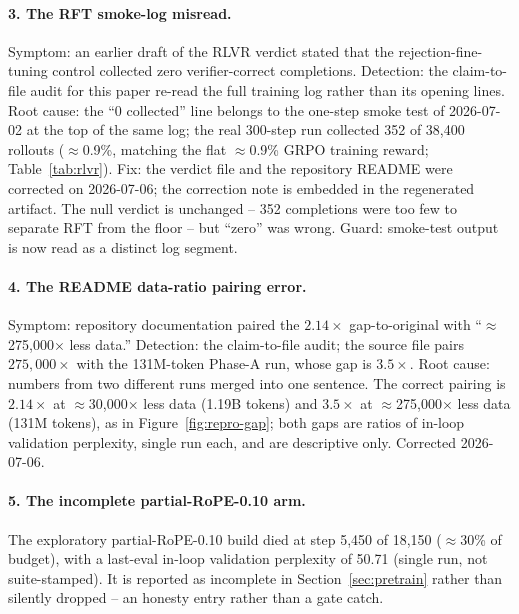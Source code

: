 \paragraph{3. The RFT smoke-log misread.}
Symptom: an earlier draft of the RLVR verdict stated that the rejection-fine-tuning control collected zero verifier-correct completions. Detection: the claim-to-file audit for this paper re-read the full training log rather than its opening lines. Root cause: the ``0 collected'' line belongs to the one-step smoke test of 2026-07-02 at the top of the same log; the real 300-step run collected 352 of 38{,}400 rollouts ($\approx$0.9\%, matching the flat $\approx$0.9\% GRPO training reward; Table~\ref{tab:rlvr}). Fix: the verdict file and the repository README were corrected on 2026-07-06; the correction note is embedded in the regenerated artifact. The null verdict is unchanged -- 352 completions were too few to separate RFT from the floor -- but ``zero'' was wrong. Guard: smoke-test output is now read as a distinct log segment.

\paragraph{4. The README data-ratio pairing error.}
Symptom: repository documentation paired the $2.14\times$ gap-to-original with ``$\approx$275{,}000$\times$ less data.'' Detection: the claim-to-file audit; the source file pairs $275{,}000\times$ with the 131M-token Phase-A run, whose gap is $3.5\times$. Root cause: numbers from two different runs merged into one sentence. The correct pairing is $2.14\times$ at $\approx$30{,}000$\times$ less data (1.19B tokens) and $3.5\times$ at $\approx$275{,}000$\times$ less data (131M tokens), as in Figure~\ref{fig:repro-gap}; both gaps are ratios of in-loop validation perplexity, single run each, and are descriptive only. Corrected 2026-07-06.

\paragraph{5. The incomplete partial-RoPE-0.10 arm.}
The exploratory partial-RoPE-0.10 build died at step 5{,}450 of 18{,}150 ($\approx$30\% of budget), with a last-eval in-loop validation perplexity of 50.71 (single run, not suite-stamped). It is reported as incomplete in Section~\ref{sec:pretrain} rather than silently dropped -- an honesty entry rather than a gate catch.

